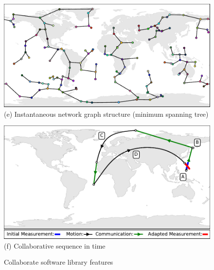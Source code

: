 \documentclass[conference]{IEEEtran}
\begin{document}
\begin{figure}[t]
\begin{minipage}[b]{\linewidth}
\begin{center}
      \includegraphics[width=\textwidth]{images/prim.pdf}
      {\footnotesize(e) Instantaneous network graph structure (minimum spanning
        tree)}
    \end{center}
    \medskip
  \end{minipage}
  \begin{minipage}[b]{\linewidth}
    \begin{center}
      \includegraphics[width=\textwidth]{images/collaborate.pdf}
      {\footnotesize(f) Collaborative sequence in time}
    \end{center}
  \end{minipage}
  \caption{Collaborate software library features}
  \label{fig:features}
\end{figure}
\end{document}
